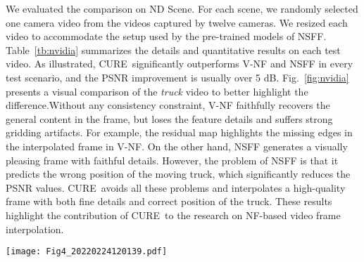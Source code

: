 \documentclass[12pt]{article}
\def\proposed{CURE}
\begin{document}
We evaluated the comparison on ND Scene. For each scene, we randomly selected one camera video from the videos captured by twelve cameras.  We resized each video to accommodate the setup used by the pre-trained models of NSFF.
Table~\ref{tb:nvidia} summarizes the details and quantitative results on each test video.  As illustrated, \proposed~significantly outperforms V-NF and NSFF in every test scenario, and the PSNR improvement is usually over 5 dB. Fig.~\ref{fig:nvidia} presents a visual comparison of the \emph{truck} video to better highlight the difference.Without any consistency constraint, V-NF faithfully recovers the general content in the frame, but loses the feature details and suffers strong gridding artifacts. For example, the residual map highlights the missing edges in the interpolated frame in V-NF. On the other hand, NSFF generates a visually pleasing frame with faithful details. However, the problem of NSFF is that it predicts the wrong position of the moving truck, which significantly reduces the PSNR values. \proposed\ avoids all these problems and interpolates a high-quality frame with both fine details and correct position of the truck.  These results highlight the contribution of \proposed~to the research on NF-based video frame interpolation.

\begin{figure*}[t!]
  \centering
  \texttt{[image: Fig4\_20220224120139.pdf]}
  \caption{Visual comparison between \proposed, vanilla-NeRF, and NSFF methods on ND Scene. The first row shows the images, and the second row shows the corresponding residual error map. We highlighted the visual difference in the yellow box. \proposed~achieves substantially higher PSNR (about 17 dB) over NSFF.}
  \label{fig:nvidia}
\end{figure*}
\end{document}
